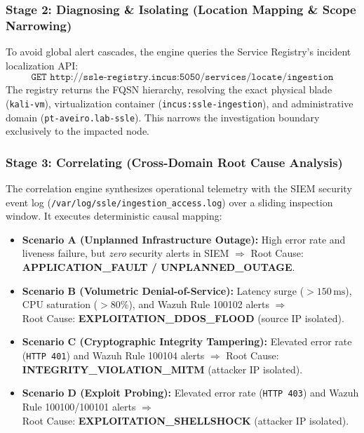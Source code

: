 \subsubsection{Stage 2: Diagnosing \& Isolating (Location Mapping \& Scope Narrowing)}
To avoid global alert cascades, the engine queries the Service Registry's incident localization API:
\begin{equation}
    \texttt{GET http://ssle-registry.incus:5050/services/locate/ingestion}
\end{equation}
The registry returns the FQSN hierarchy, resolving the exact physical blade (\texttt{kali-vm}), virtualization container (\texttt{incus:ssle-ingestion}), and administrative domain (\texttt{pt-aveiro.lab-ssle}). This narrows the investigation boundary exclusively to the impacted node.

\subsubsection{Stage 3: Correlating (Cross-Domain Root Cause Analysis)}
The correlation engine synthesizes operational telemetry with the SIEM security event log (\texttt{/var/log/ssle/ingestion\_access.log}) over a sliding inspection window. It executes deterministic causal mapping:
\begin{itemize}
    \item \textbf{Scenario A (Unplanned Infrastructure Outage):} High error rate and liveness failure, but \textit{zero} security alerts in SIEM $\Longrightarrow$ Root Cause: \textbf{APPLICATION\_FAULT / UNPLANNED\_OUTAGE}.
    \item \textbf{Scenario B (Volumetric Denial-of-Service):} Latency surge ($>150\,\text{ms}$), CPU saturation ($>80\%$), and Wazuh Rule 100102 alerts $\Longrightarrow$\\
    Root Cause: \textbf{EXPLOITATION\_DDOS\_FLOOD} (source IP isolated).
    \item \textbf{Scenario C (Cryptographic Integrity Tampering):} Elevated error rate (\texttt{HTTP 401}) and Wazuh Rule 100104 alerts $\Longrightarrow$ Root Cause: \textbf{INTEGRITY\_VIOLATION\_MITM} (attacker IP isolated).
    \item \textbf{Scenario D (Exploit Probing):} Elevated error rate (\texttt{HTTP 403}) and Wazuh Rule 100100/100101 alerts $\Longrightarrow$\\
    Root Cause: \textbf{EXPLOITATION\_SHELLSHOCK} (attacker IP isolated).
\end{itemize}

